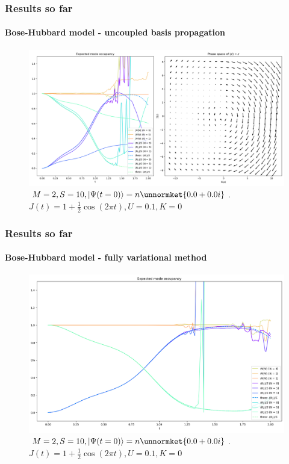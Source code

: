 \documentclass[english]{beamer}
\begin{document}
  \begin{frame}
  	\frametitle{Results so far}
  	\framesubtitle{Bose-Hubbard model - uncoupled basis propagation}
  	\begin{figure}
	\centering
    		\includegraphics[width=1.0\textwidth]{images/BH_M=2_uncoupled_basis}
    		\caption{$M=2, S=10, \ket{\Psi(t=0)}=n\unnormket{0.0+0.0i}$. $J(t)=1+\frac{1}{2}\cos(2\pi t), U=0.1, K=0$}
    		\label{fig:BH2}
	\end{figure}
  \end{frame}
  
  \begin{frame}
  	\frametitle{Results so far}
  	\framesubtitle{Bose-Hubbard model - fully variational method}
  	\begin{figure}
	\centering
    		\includegraphics[width=1.0\textwidth]{images/BH_M=2}
    		\caption{$M=2, S=10, \ket{\Psi(t=0)}=n\unnormket{0.0+0.0i}$. $J(t)=1+\frac{1}{2}\cos(2\pi t), U=0.1, K=0$}
    		\label{fig:BH2}
	\end{figure}
  \end{frame}
  
\end{document}
